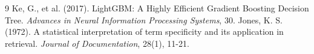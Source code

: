 \documentclass[11pt,a4paper]{article}
\begin{document}
\vspace{-0.5em}
\begin{thebibliography}{9}
\setlength{\itemsep}{0pt}
\setlength{\parskip}{0pt}
 Ke, G., et al. (2017). LightGBM: A Highly Efficient Gradient Boosting Decision Tree. \textit{Advances in Neural Information Processing Systems}, 30.
 Jones, K. S. (1972). A statistical interpretation of term specificity and its application in retrieval. \textit{Journal of Documentation}, 28(1), 11-21.
\end{thebibliography}
\end{document}
